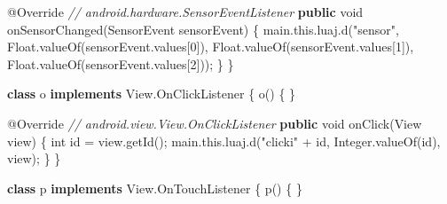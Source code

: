 \documentclass[
]{article}
\newenvironment{Shaded}{}{}
\newcommand{\AttributeTok}[1]{\textcolor[rgb]{0.49,0.56,0.16}{#1}}
\newcommand{\BuiltInTok}[1]{\textcolor[rgb]{0.00,0.50,0.00}{#1}}
\newcommand{\CommentTok}[1]{\textcolor[rgb]{0.38,0.63,0.69}{\textit{#1}}}
\newcommand{\DataTypeTok}[1]{\textcolor[rgb]{0.56,0.13,0.00}{#1}}
\newcommand{\DecValTok}[1]{\textcolor[rgb]{0.25,0.63,0.44}{#1}}
\newcommand{\FunctionTok}[1]{\textcolor[rgb]{0.02,0.16,0.49}{#1}}
\newcommand{\KeywordTok}[1]{\textcolor[rgb]{0.00,0.44,0.13}{\textbf{#1}}}
\newcommand{\NormalTok}[1]{#1}
\newcommand{\OperatorTok}[1]{\textcolor[rgb]{0.40,0.40,0.40}{#1}}
\newcommand{\StringTok}[1]{\textcolor[rgb]{0.25,0.44,0.63}{#1}}
\begin{document}
\begin{Shaded}
\begin{Highlighting}[]
        \AttributeTok{@Override} \CommentTok{// android.hardware.SensorEventListener}
        \KeywordTok{public} \DataTypeTok{void} \FunctionTok{onSensorChanged}\OperatorTok{(}\NormalTok{SensorEvent sensorEvent}\OperatorTok{)} \OperatorTok{\{}
\NormalTok{            main}\OperatorTok{.}\FunctionTok{this}\OperatorTok{.}\FunctionTok{luaj}\OperatorTok{.}\FunctionTok{d}\OperatorTok{(}\StringTok{"sensor"}\OperatorTok{,} \BuiltInTok{Float}\OperatorTok{.}\FunctionTok{valueOf}\OperatorTok{(}\NormalTok{sensorEvent}\OperatorTok{.}\FunctionTok{values}\OperatorTok{[}\DecValTok{0}\OperatorTok{]),} \BuiltInTok{Float}\OperatorTok{.}\FunctionTok{valueOf}\OperatorTok{(}\NormalTok{sensorEvent}\OperatorTok{.}\FunctionTok{values}\OperatorTok{[}\DecValTok{1}\OperatorTok{]),} \BuiltInTok{Float}\OperatorTok{.}\FunctionTok{valueOf}\OperatorTok{(}\NormalTok{sensorEvent}\OperatorTok{.}\FunctionTok{values}\OperatorTok{[}\DecValTok{2}\OperatorTok{]));}
        \OperatorTok{\}}
    \OperatorTok{\}}

    \KeywordTok{class}\NormalTok{ o }\KeywordTok{implements} \BuiltInTok{View}\OperatorTok{.}\FunctionTok{OnClickListener} \OperatorTok{\{}
        \FunctionTok{o}\OperatorTok{()} \OperatorTok{\{}
        \OperatorTok{\}}

        \AttributeTok{@Override} \CommentTok{// android.view.View.OnClickListener}
        \KeywordTok{public} \DataTypeTok{void} \FunctionTok{onClick}\OperatorTok{(}\BuiltInTok{View}\NormalTok{ view}\OperatorTok{)} \OperatorTok{\{}
            \DataTypeTok{int}\NormalTok{ id }\OperatorTok{=}\NormalTok{ view}\OperatorTok{.}\FunctionTok{getId}\OperatorTok{();}
\NormalTok{            main}\OperatorTok{.}\FunctionTok{this}\OperatorTok{.}\FunctionTok{luaj}\OperatorTok{.}\FunctionTok{d}\OperatorTok{(}\StringTok{"clicki"} \OperatorTok{+}\NormalTok{ id}\OperatorTok{,} \BuiltInTok{Integer}\OperatorTok{.}\FunctionTok{valueOf}\OperatorTok{(}\NormalTok{id}\OperatorTok{),}\NormalTok{ view}\OperatorTok{);}
        \OperatorTok{\}}
    \OperatorTok{\}}

    \KeywordTok{class}\NormalTok{ p }\KeywordTok{implements} \BuiltInTok{View}\OperatorTok{.}\FunctionTok{OnTouchListener} \OperatorTok{\{}
        \FunctionTok{p}\OperatorTok{()} \OperatorTok{\{}
        \OperatorTok{\}}


\end{Highlighting}
\end{Shaded}
\end{document}
